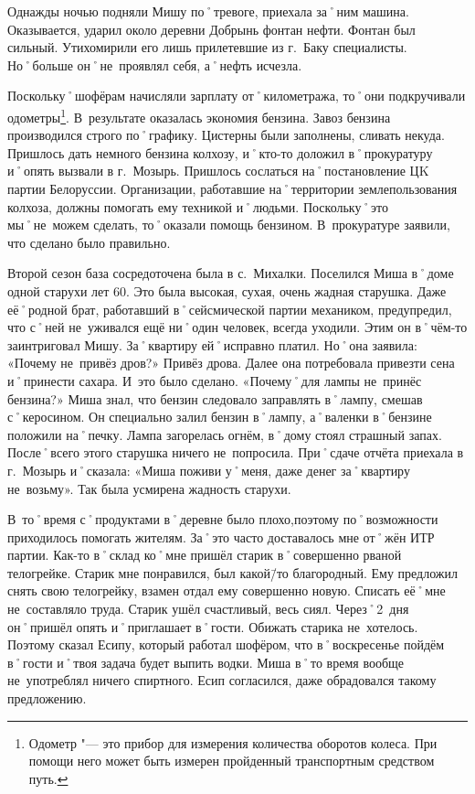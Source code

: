 Однажды ночью подняли Мишу по˚тревоге, приехала за˚ним машина. Оказывается, ударил около деревни Добрынь фонтан нефти. Фонтан был сильный. Утихомирили его лишь прилетевшие из г.~Баку специалисты. Но˚больше он˚не~проявлял себя, а˚нефть исчезла. 

Поскольку˚шофёрам начисляли зарплату от˚километража, то˚они подкручивали одометры\footnote
{Одометр "--- это прибор для измерения количества оборотов колеса. При помощи него может быть измерен пройденный транспортным средством путь.}. В~результате оказалась экономия бензина. Завоз бензина производился строго по˚графику. Цистерны были заполнены, сливать некуда. Пришлось дать немного бензина колхозу, и˚кто-то доложил в˚прокуратуру и˚опять вызвали в г.~Мозырь. Пришлось сослаться на˚постановление ЦK партии Белоруссии. Организации, работавшие на˚территории землепользования колхоза, должны помогать ему техникой и˚людьми. Поскольку˚это мы˚не~можем сделать, то˚оказали помощь бензином. В~прокуратуре заявили, что сделано было правильно.

Второй сезон база сосредоточена была в с.~Михалки. Поселился Миша в˚доме одной старухи лет 60. Это была высокая, сухая, очень жадная старушка. Даже её˚родной брат, работавший в˚сейсмической партии механиком, предупредил, что с˚ней не~уживался ещё ни˚один человек, всегда уходили. Этим он в˚чём-то заинтриговал Мишу. За˚квартиру ей˚исправно платил. Но˚она заявила: «Почему не~привёз  дров?» Привёз дрова. Далее она потребовала привезти сена и˚принести сахара. И~это было сделано. «Почему˚для лампы не~принёс бензина?» Миша знал, что бензин следовало заправлять в˚лампу, смешав с˚керосином. Он специально залил бензин в˚лампу, а˚валенки в˚бензине положили на˚печку. Лампа загорелась огнём, в˚дому стоял страшный запах. После˚всего этого старушка ничего не~попросила. При˚сдаче отчёта приехала в г.~Мозырь и˚сказала: «Миша поживи у˚меня, даже денег за˚квартиру не~возьму». Так была усмирена жадность старухи.

В~то˚время с˚продуктами в˚деревне было плохо,поэтому по˚возможности приходилось помогать жителям. За˚это часто доставалось мне от˚жён ИТР партии. Как-то в˚склад ко˚мне пришёл старик в˚совершенно рваной телогрейке. Старик мне понравился, был какой\=/то благородный. Ему предложил снять свою телогрейку, взамен отдал ему совершенно новую. Списать её˚мне не~составляло труда. Старик ушёл счастливый, весь сиял. Через˚2~дня он˚пришёл опять и˚приглашает в˚гости. Обижать старика не~хотелось. Поэтому сказал Есипу, который работал шофёром, что в˚воскресенье пойдём в˚гости и˚твоя задача будет выпить водки. Миша в˚то время вообще не~употреблял ничего спиртного. Есип согласился, даже обрадовался такому предложению. 

